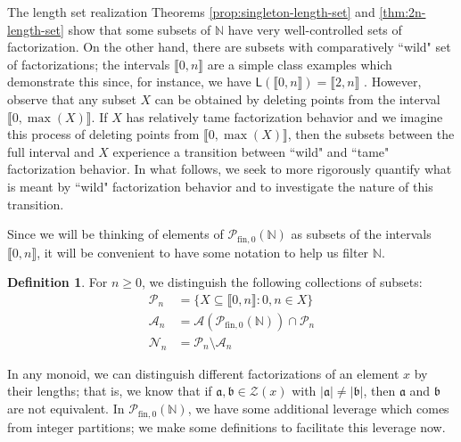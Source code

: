 \documentclass{report}
\renewcommand{\aa}{\mathfrak{a}}
\newcommand{\bb}{\mathfrak{b}}
\newcommand{\NN}{\mathbb{N}}
\renewcommand{\P}{\mathcal{P}}
\newcommand{\Z}{\mathcal{Z}}
\newcommand{\llb}{\llbracket}
\newcommand{\rrb}{\rrbracket}
\newcommand{\fin}{\textrm{fin}}
\renewcommand{\:}{\text{:}}
\newcommand{\PN}{{\P_{\fin,0}(\NN)}}
\theoremstyle{definition}
\newtheorem{defn}{Definition}[section]
\begin{document}
The length set realization Theorems \ref{prop:singleton-length-set} and \ref{thm:2n-length-set} show that some subsets of $\NN$ have very well-controlled sets of factorization.
On the other hand, there are subsets with comparatively ``wild" set of factorizations; the intervals $\llb 0,n \rrb$ are a simple class examples which demonstrate this since, for instance, we have $\mathsf{L}(\llb0,n\rrb) = \llb 2,n \rrb$ \cite[Proposition 4.8]{fan-tringali18}.
However, observe that any subset $X$ can be obtained by deleting points from the interval $\llb 0,\max(X) \rrb$.
If $X$ has relatively tame factorization behavior and we imagine this process of deleting points from $\llb 0,\max(X)\rrb$, then the subsets between the full interval and $X$ experience a transition between ``wild" and ``tame" factorization behavior.
In what follows, we seek to more rigorously quantify what is meant by ``wild" factorization behavior and to investigate the nature of this transition.

Since we will be thinking of elements of $\PN$ as subsets of the intervals $\llb 0,n \rrb$, it will be convenient to have some notation to help us filter $\NN$.


\begin{defn} \label{def:filtration}
For $n\ge 0$, we distinguish the following collections of subsets:
\begin{align*}
 \P_n &= \{ X \subseteq \llb 0,n \rrb : 0,n\in X \} \\
\mathcal{A}_n &= \mathcal{A}(\PN) \cap \P_n  \\
\mathcal{N}_n &= \P_n \setminus \mathcal{A}_n 
\end{align*}
\end{defn}



In any monoid, we can distinguish different factorizations of an element $x$ by their lengths; that is, we know that if $\aa,\bb\in \Z(x)$ with $|\aa| \neq |\bb|$, then $\aa$ and $\bb$ are not equivalent.
In $\PN$, we have some additional leverage which comes from integer partitions; we make some definitions to facilitate this leverage now.
\end{document}
